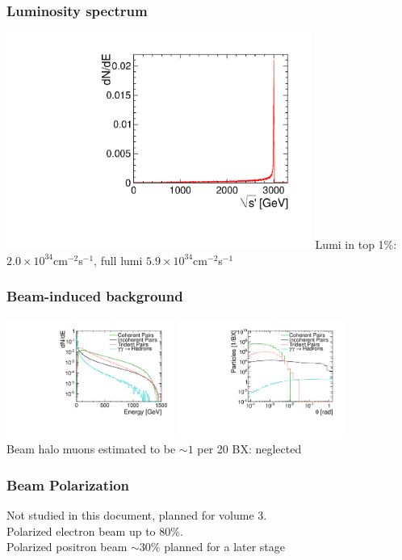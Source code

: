 \documentclass{beamer}
\begin{document}
\begin{frame}
\frametitle{Luminosity spectrum}
\includegraphics[width=10cm]{Lumi3TeV_fixed_nopeak.pdf}
Lumi in top 1\%: $2.0\times10^{34}$cm$^{-2}$s$^{-1}$, full lumi
$5.9\times10^{34}$cm$^{-2}$s$^{-1}$
\end{frame}
\begin{frame}
\frametitle{Beam-induced background}
\includegraphics[width=5.5cm]{Energy.pdf}
\includegraphics[width=5.5cm]{Angle.pdf}\\
Beam halo muons estimated to be $\sim1$ per 20 BX: neglected
\end{frame}
\begin{frame}
\frametitle{Beam Polarization}
Not studied in this document, planned for volume 3.\\
Polarized electron beam up to 80\%.\\
Polarized positron beam $\sim30\%$ planned for a later stage
\end{frame}
\end{document}
